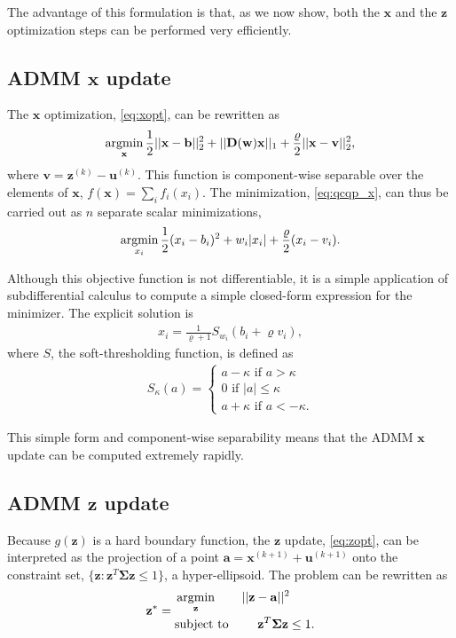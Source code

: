 \documentclass[aip, jcp, reprint, nolinenumbers, twocolumn, nobalancelastpage, nofootinbib]{revtex4-1}
\newcommand{\argmin}{\operatornamewithlimits{argmin}}
\begin{document}
The advantage of this formulation is that, as we now show, both the $\mathbf{x}$ and the $\mathbf{z}$ optimization steps can be performed very efficiently.

\subsection{ADMM $\mathbf{x}$ update}
The $\mathbf{x}$ optimization, \cref{eq:xopt}, can be rewritten as
\begin{align}
\argmin_\mathbf{x} \frac{1}{2}||\mathbf{x} - \mathbf{b}||_2^2 + ||\mathbf{D}(\mathbf{w})\mathbf{x}||_1 + \frac{\varrho}{2}||\mathbf{x} - \mathbf{v}||^2_2, \label{eq:qcqp_x}
\end{align}
where $\mathbf{v}=\mathbf{z}^{(k)}-\mathbf{u}^{(k)}$. This function is component-wise separable over the elements of $\mathbf{x}$, $f(\mathbf{x}) = \sum_i f_i(x_i)$. The minimization, \cref{eq:qcqp_x},  can thus be carried out as $n$ separate scalar minimizations,
\begin{align}
\argmin_{x_i} \frac{1}{2}(x_i-b_i)^2 + w_i |x_i| + \frac{\varrho}{2}(x_i-v_i).
\end{align}

Although this objective function is not differentiable, it is a simple application of subdifferential calculus to compute a simple closed-form expression for the minimizer. The explicit solution is
\begin{align}
x_i = \frac{1}{\varrho+1} S_{w_i}(b_i + \varrho v_i),
\end{align}
where $S$, the soft-thresholding function, is defined as
\begin{align}
S_{\kappa}(a) = \begin{cases}
a - \kappa \text{ if } a > \kappa \\
0 \text{ if } |a| \leq \kappa \\
a + \kappa \text{ if } a < -\kappa.
\end{cases}
\end{align}

This simple form and component-wise separability means that the ADMM $\mathbf{x}$ update can be computed extremely rapidly.

\subsection{ADMM $\mathbf{z}$ update}
Because $g(\mathbf{z})$ is a hard boundary function, the $\mathbf{z}$ update, \cref{eq:zopt}, can be interpreted as the projection of a point $\mathbf{a} = \mathbf{x}^{(k+1)}+\mathbf{u}^{(k+1)}$ onto the constraint set, $\{\mathbf{z} : \mathbf{z}^T\mathbf{\Sigma}\mathbf{z} \leq 1\}$, a hyper-ellipsoid. The problem  can be rewritten as
\begin{align}
\mathbf{z}^* = \begin{aligned}
&\argmin_\mathbf{z}\hspace{2em} ||\mathbf{z}-\mathbf{a}||^2 \\
&\text{subject to }\hspace{2em} \mathbf{z}^T \mathbf{\Sigma} \mathbf{z} \leq 1.
\end{aligned}
\end{align}
\end{document}
